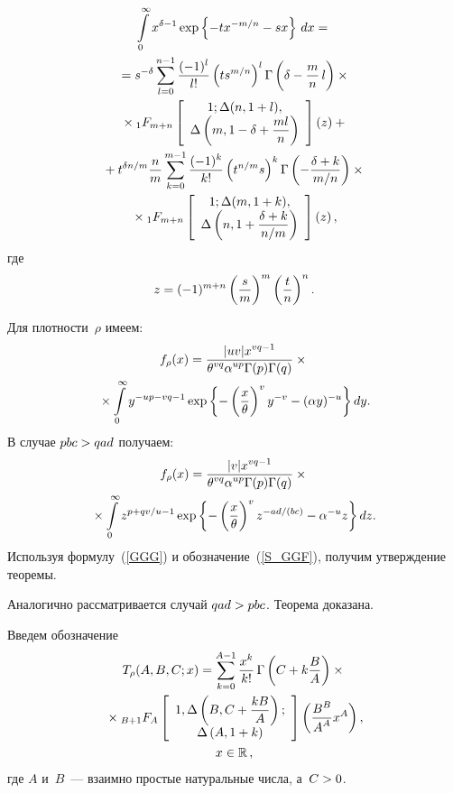 \begin{multicols}{2}
\noindent
\begin{multline}
\int\limits_0^{\infty} x^{\delta-1}\exp\left\{-tx^{-m/n}-sx\right\}\,dx = {}\\
{}= s^{-\delta} \sum\limits_{l=0}^{n-1}\fr{(-1)^l}{l!}\left(ts^{m/n}\right)^l
\Gamma\left( \delta - \fr{m}{n}\,l \right)\times{}\\
{}\times
{}_1F_{m+n}\left[\begin{array}{c}
1; \Delta(n,1+l),\\
\Delta\left(m, 1-\delta+\fr{ml}{n}\right)
\end{array}
\right]\left(z \right) +{}\\
{}+ t^{\delta n/m}\fr{n}{m}
\sum\limits_{k=0}^{m-1} \fr{(-1)^k}{k!}\left(t^{n/m}s \right)^k \Gamma\left(-\fr{\delta+k}{m/n}\right)\times{}\\
{}\times
{}_1F_{m+n}\left[
\begin{array}{c}
1; \Delta(m,1+k),\\
\Delta\left(n, 1+\fr{\delta+k}{n/m}\right)
\end{array}\right]
\left( z \right),
\label{GGG}
\end{multline}
где
$$
z = (-1)^{m+n}\left( \displaystyle\frac{\displaystyle s\mathstrut}{\displaystyle m\mathstrut} \right)^m \left( \displaystyle\frac{\displaystyle t\mathstrut}{\displaystyle n\mathstrut} \right)^n.
$$

Для плотности~$\rho$ имеем:
\begin{multline*}
f_\rho(x) = \displaystyle\frac{\displaystyle |uv| x^{vq-1} \mathstrut}{\displaystyle  \theta^{vq}\alpha^{up} \Gamma(p)\Gamma(q)\mathstrut} \times{}\\
{}\times
\int\limits_0^\infty y^{-up-vq-1} \exp\left\{-\left(\displaystyle\frac{\displaystyle x\mathstrut}{\displaystyle \theta\mathstrut} \right)^{v}y^{-v}-
(\alpha y)^{-u}\right\} dy.
\end{multline*}
В случае $pbc \hm> qad$ получаем:
\begin{multline*}
f_\rho(x) = \displaystyle\frac{\displaystyle |v| x^{vq-1} \mathstrut}{\displaystyle \theta^{vq}\alpha^{up}  \Gamma(p)\Gamma(q)\mathstrut}\times{}\\
\!{}\times
\int\limits_0^\infty z^{p+qv/u-1} \exp\left\{-\left( \displaystyle\frac{\displaystyle x\mathstrut}{\displaystyle \theta\mathstrut} \right)^{v}z^{-ad/(bc)}-
\alpha^{-u}z\right\}dz.
\end{multline*}
Используя формулу~(\ref{GGG}) и обозначение~(\ref{S_GGF}), получим утверждение теоремы.

Аналогично рассматривается случай $ qad \hm> pbc$.
Теорема доказана.

\smallskip

Введем обозначение
\begin{multline}
T_\rho(A, B, C; x) = \sum\limits_{k=0}^{A-1}\fr{x^k}{k!}\,
\Gamma\left(C + k\fr{B}{A} \right)\times{}\\
{}\times {}_{B+1}F_{A}\left[
    \begin{array}{c}
    1, \Delta\left(B, C + \fr{kB}{A}\right); \\
    \Delta\left(A, 1+k\right)
    \end{array}\right]\left(
    \fr{B^B}{A^A}x^A
    \right), \\
      x\in\mathbb{R}\,,
    \label{T_GGF}
    \end{multline}
где $A$ и~$B$~--- взаимно простые натуральные числа, а~$C\hm>0$.


\end{multicols}
